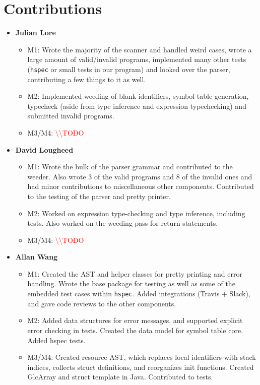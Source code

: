 \documentclass[11pt]{article}
\newcommand{\todo}[0]{\textcolor{red}{\textbackslash\textbackslash TODO \ }}
\begin{document}
\section{Contributions}
\begin{itemize}
	\item \textbf{Julian Lore}
	\begin{itemize}
		\item M1: Wrote the majority of the scanner and
		handled weird cases, wrote a large amount of valid/invalid programs,
		implemented many other tests (\texttt{hspec} or small tests in our
		program) and looked over the parser, contributing a few things to it
		as well.
		\item M2: Implemented weeding of blank identifiers,
		symbol table generation, typecheck (aside from type inference and
		expression typechecking) and submitted invalid programs.
		\item M3/M4: \todo
	\end{itemize}
	\item \textbf{David Lougheed}
	\begin{itemize}
		\item M1: Wrote the bulk of the parser grammar
		and contributed to the weeder. Also wrote 3 of the valid programs
		and 8 of the invalid ones and had minor contributions to
		miscellaneous other components.  Contributed to the testing of the
		parser and pretty printer.
		\item M2: Worked on expression type-checking and
		type inference, including tests. Also worked on the weeding pass for
		return statements.
		\item M3/M4: \todo
	\end{itemize}
	\item \textbf{Allan Wang}
	\begin{itemize}
		\item M1: Created the AST and helper classes for
		pretty printing and error handling.  Wrote the base package for
		testing as well as some of the embedded test cases within
		\texttt{hspec}.  Added integrations (Travis + Slack), and gave code
		reviews to the other components.
		\item M2: Added data structures for error messages,
		and supported explicit error checking in tests. Created the data
		model for symbol table core. Added hspec tests.
		\item M3/M4: Created resource AST, which replaces local identifiers with stack indices, collects struct definitions, and reorganizes init functions. Created GlcArray and struct template in Java. Contributed to tests.
	\end{itemize}
\end{itemize}

\newpage

 
\end{document}
